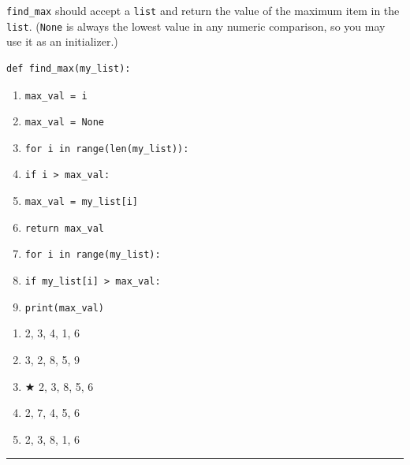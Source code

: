 \documentclass{article}
\newenvironment{answers}{\begin{enumerate}}{\end{enumerate}}
\newcommand{\answer}{\item }
\newcommand{\correctanswer}{\item $\bigstar$ }
\newenvironment{solution}{{\bf Solution.} }{\vspace*{.3in}\hrule}
\begin{document}
\texttt{find\_max} should accept a \texttt{list} and return the value of the maximum item in the \texttt{list}.  (\texttt{None} is always the lowest value in any numeric comparison, so you may use it as an initializer.)

\begin{verbatim}
def find_max(my_list):
\end{verbatim}

\begin{enumerate}[1]
\item \texttt{max\_val = i}
\item \texttt{max\_val = None}
\item \texttt{for i in range(len(my\_list)):}
\item \texttt{if i > max\_val:}
\item \texttt{max\_val = my\_list[i]}
\item \texttt{return max\_val}
\item \texttt{for i in range(my\_list):}
\item \texttt{if my\_list[i] > max\_val:}
\item \texttt{print(max\_val)}
\end{enumerate}

\begin{answers}
\answer  2, 3, 4, 1, 6
\answer  3, 2, 8, 5, 9
\correctanswer  2, 3, 8, 5, 6
\answer  2, 7, 4, 5, 6
\answer  2, 3, 8, 1, 6
\end{answers}
\begin{solution}
\end{solution}
\end{document}
